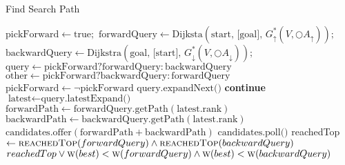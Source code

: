\begin{algorithm}
    \caption{Find Search Path}
    \label{alg:cchSearch}
    \begin{algorithmic}[1]
        \State $\text{pickForward} \gets \text{true};$ 
        \State $\text{forwardQuery} \gets \text{Dijksta}(\text{start, [goal], } G^{*}_{\uparrow} (V,\bigcirc A_\uparrow));$
        \State $\text{backwardQuery} \gets \text{Dijkstra}(\text{goal, [start], } G^{*}_{\downarrow} (V, \bigcirc A_\downarrow));$
            \State $\text{query} \gets \text{pickForward} ? \text{forwardQuery} : \text{backwardQuery}$
            \State $\text{other} \gets \text{pickForward} ? \text{backwardQuery} : \text{forwardQuery}$
            \State $\text{pickForward} \gets \neg \text{pickForward}$
                 $\text{query.expandNext()}$
            \Else
                 \textbf{ continue}
            \EndIf            
            \State $\text{latest} \gets \text{query.latestExpand()}$
                \State $\text{forwardPath} \gets \text{forwardQuery.getPath}(\text{latest.rank})$
                \State $\text{backwardPath} \gets \text{backwardQuery.getPath}(\text{latest.rank})$
                \State $\text{candidates.offer}(\text{forwardPath} + \text{backwardPath})$
            \EndIf
        \EndWhile
        \State \Return $\text{candidates.poll()}$
    \EndFunction
    \State reachedTop $\gets \Call{reachedTop}{forwardQuery} \land \Call{reachedTop}{backwardQuery}$ 
    \State \Return $reachedTop  \lor \Call{w}{best} < \Call{w}{forwardQuery} \land \Call{w}{best} < \Call{w}{backwardQuery}$
    \EndFunction
    \end{algorithmic}
\end{algorithm}